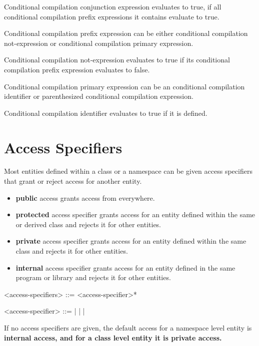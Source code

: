 \documentclass[a4paper,oneside,11pt]{article}
\begin{document}
Conditional compilation conjunction expression evaluates to true,
if all conditional compilation prefix expressions it contains evaluate to true.

Conditional compilation prefix expression can be either conditional compilation not-expression
or conditional compilation primary expression.

Conditional compilation not-expression evaluates to true if its conditional compilation
prefix expression evaluates to false.

Conditional compilation primary expression can be an conditional compilation identifier or
parenthesized conditional compilation expression.

Conditional compilation identifier evaluates to true if it is defined.

\section{Access Specifiers}

Most entities defined within a class or a namespace can be given access specifiers that grant or reject access for another entity.

\begin{itemize}
\item{\bf{public}} access grants access from everywhere.

\item{\bf{protected}} access specifier grants access for an entity defined within the same or derived class and rejects it for other entities.

\item{\bf{private}} access specifier grants access for an entity defined within the same class and rejects it for other entities.

\item{\bf{internal}} access specifier grants access for an entity defined in the same program or library and rejects it for other entities.
\end{itemize}

\begin{grammar}
\label{access-specifiers}<access-specifiers> ::= <access-specifier>*

\label{access-specifier}<access-specifier> ::=  |  |  | 
\end{grammar}

If no access specifiers are given, the default access for a namespace level entity is \bf{internal} access, and for a class level entity it is \bf{private} access.
\end{document}
